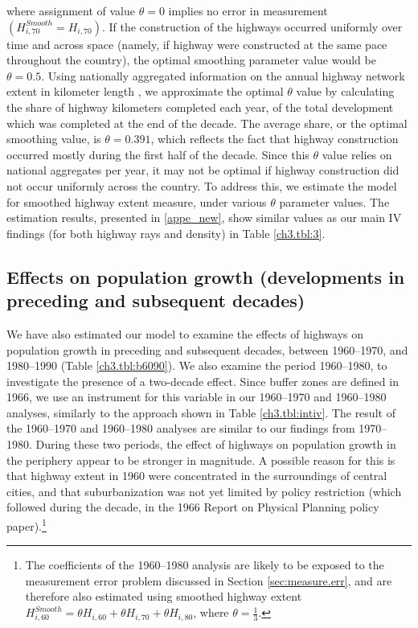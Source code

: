 \documentclass[a4paper,authoryear,review]{elsarticle}  	%
\begin{document}
	where assignment of value $\theta=0$ implies no error in measurement $(H^{Smooth}_{i,70} = H_{i,70})$. If the construction of the highways occurred uniformly over time and across space (namely, if highway were constructed at the same pace throughout the country), the optimal smoothing parameter value would be $\theta=0.5$. Using nationally aggregated information on the annual highway network extent in kilometer length \citep{Ligtermoet1990}, we approximate the optimal $\theta$ value by calculating the share of highway kilometers completed each year, of the total development which was completed at the end of the decade. The average share, or the optimal smoothing value, is $\theta=0.391$, which reflects the fact that highway construction occurred mostly during the first half of the decade. Since this $\theta$ value relies on national aggregates per year, it may not be optimal if highway construction did not occur uniformly across the country. To address this, we estimate the model for smoothed highway extent measure, under various $\theta$ parameter values. The estimation results, presented in \ref{appe_new}, show similar values as our main IV findings (for both highway rays and density) in Table \ref{ch3.tbl:3}. 
			
\subsection{Effects on population growth (developments in preceding and subsequent decades)}
	We have also estimated our model to examine the effects of highways on population growth in preceding and subsequent decades, between 1960--1970, and 1980--1990 (Table \ref{ch3.tbl:b6090}). We also examine the period 1960--1980, to investigate the presence of a two-decade effect.
	Since buffer zones are defined in 1966, we use an instrument for this variable in our 1960--1970 and 1960--1980 analyses, similarly to the approach shown in Table \ref{ch3.tbl:intiv}. The result of the 1960--1970 and 1960--1980 analyses are similar to our findings from 1970--1980. During these two periods, the effect of highways on population growth in the periphery appear to be stronger in magnitude. A possible reason for this is that highway extent in 1960 were concentrated in the surroundings of central cities, and that suburbanization was not yet limited by policy restriction (which followed during the decade, in the 1966 Report on Physical Planning policy paper).\footnote{The coefficients of the 1960--1980 analysis are likely to be exposed to the measurement error problem discussed in Section \ref{sec:measure.err}, and are therefore also estimated using smoothed highway extent $H^{Smooth}_{i,60} = \theta H_{i,60} + \theta  H_{i,70} + \theta H_{i,80}$, where $\theta = \frac{1}{3}$.}	
	
\end{document}
